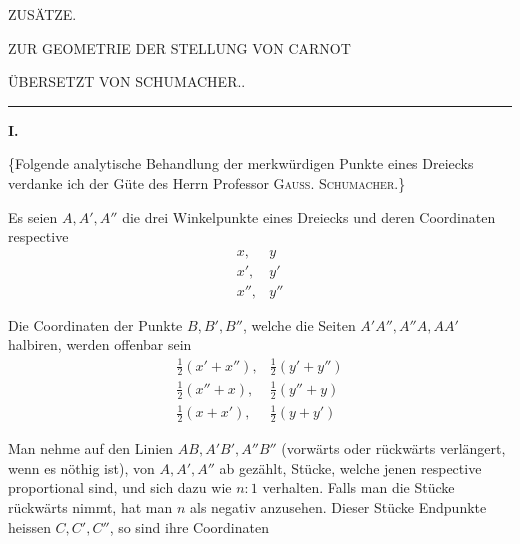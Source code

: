 \clearpage
{}
\begin{center}
{\Large ZUSÄTZE.}\par\bigskip
ZUR GEOMETRIE DER STELLUNG VON CARNOT\par\bigskip
ÜBERSETZT VON SCHUMACHER..\par\bigskip
\rule{.1\textwidth}{.3pt}
\end{center}
\par\medskip{}
\centerline{\textbf{I.}}\nobreak\smallskip
\{Folgende analytische Behandlung der merkwürdigen Punkte eines Dreiecks verdanke ich der Güte des Herrn Professor \textsc{Gauss}. \textsc{Schumacher}.\}

Es seien \(A,A',A''\) die drei Winkelpunkte eines Dreiecks und deren Coordinaten respective
\[
\begin{array}{ll}
x,&y\\x',&y'\\x'',&y''
\end{array}
\]
\par
Die Coordinaten der Punkte \(B,B',B''\), welche die Seiten \(A'A'',A''A,AA'\) halbiren, werden offenbar sein
\[
\begin{array}{ll}
\tfrac12(x'+x''),&\tfrac12(y'+y'')\\
\tfrac12(x''+x),&\tfrac12(y''+y)\\
\tfrac12(x+x'),&\tfrac12(y+y')
\end{array}
\]
\par
Man nehme auf den Linien \(AB,A'B',A''B''\) (vorwärts oder rückwärts verlängert, wenn es nöthig ist), von \(A,A',A''\) ab gezählt, Stücke, welche jenen respective proportional sind, und sich dazu wie \(n:1\) verhalten. Falls man die Stücke rückwärts nimmt, hat man \(n\) als negativ anzusehen. Dieser Stücke Endpunkte heissen \(C,C',C''\), so sind ihre Coordinaten
